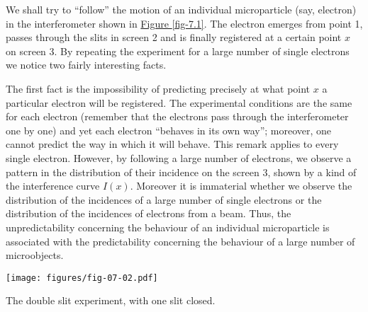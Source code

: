 \documentclass[a4paper,sfsidenotes,colorlinks=true]{tufte-book}
\numberwithin{equation}{section}
\numberwithin{figure}{section}
\begin{document}
We shall try to ``follow'' the motion of an individual microparticle (say, electron) in the interferometer shown in  \hyperref[fig-7.1]{Figure \ref{fig-7.1}}. The electron emerges from point \textsf{1}, passes through the slits in screen \textsf{2} and is finally registered at a certain point $x$ on screen \textsf{3}. By repeating the experiment for a large number of single electrons we notice two fairly interesting facts.


The first fact is the impossibility of predicting precisely at what point $x$ a particular electron will be registered. The experimental conditions are the same for each electron (remember that the electrons pass through the interferometer one by one) and yet each electron ``behaves in its own way''; moreover, one cannot predict the way in which it will behave. This remark applies to every single electron. However, by following a large number of electrons, we observe a pattern in the distribution of their incidence on the screen \textsf{3}, shown by a kind of the interference curve $I(x)$. Moreover it is immaterial whether we observe the distribution of the incidences of a large number of single electrons or the distribution of the incidences of electrons from a beam. Thus, the unpredictability concerning the behaviour of an individual microparticle is associated with the predictability concerning the behaviour of a large number of microobjects.

\begin{marginfigure}
\centering
\texttt{[image: figures/fig-07-02.pdf]}
\caption{The double slit experiment, with one slit closed.}
\label{fig-7.2}
\end{marginfigure}
\end{document}
